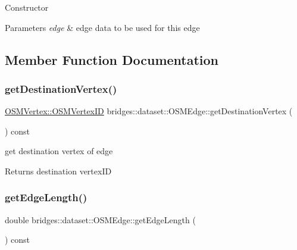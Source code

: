 Constructor 
\begin{DoxyParams}{Parameters}
{\em edge} & edge data to be used for this edge \\
\hline
\end{DoxyParams}


\subsection{Member Function Documentation}
\mbox{\label{classbridges_1_1dataset_1_1_o_s_m_edge_ae9b23f06502688abd4ebc7b03abef7bc}} 
\subsubsection{\texorpdfstring{get\+Destination\+Vertex()}{getDestinationVertex()}}
{\footnotesize\ttfamily \hyperlink{classbridges_1_1dataset_1_1_o_s_m_vertex_ad166f13b0aefbdc05a273546f2a3bb96}{O\+S\+M\+Vertex\+::\+O\+S\+M\+Vertex\+ID} bridges\+::dataset\+::\+O\+S\+M\+Edge\+::get\+Destination\+Vertex (\begin{DoxyParamCaption}{ }\end{DoxyParamCaption}) const\hspace{0.3cm}{\ttfamily [inline]}}

get destination vertex of edge

\begin{DoxyReturn}{Returns}
destination vertex\+ID 
\end{DoxyReturn}
\mbox{\label{classbridges_1_1dataset_1_1_o_s_m_edge_a4317cc9c09aa9a5108031185047cb399}} 
\subsubsection{\texorpdfstring{get\+Edge\+Length()}{getEdgeLength()}}
{\footnotesize\ttfamily double bridges\+::dataset\+::\+O\+S\+M\+Edge\+::get\+Edge\+Length (\begin{DoxyParamCaption}{ }\end{DoxyParamCaption}) const\hspace{0.3cm}{\ttfamily [inline]}}

